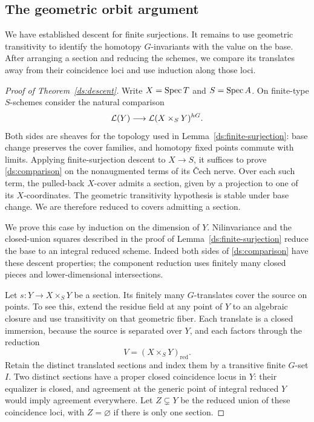 \subsection{The geometric orbit argument}

We have established descent for finite surjections. It remains to use
geometric transitivity to identify the homotopy $G$-invariants with the
value on the base. After arranging a section and reducing the schemes,
we compare its translates away from their coincidence loci and use
induction along those loci.

\begin{proof}[Proof of Theorem~\ref{ds:descent}]
Write $X=\operatorname{Spec} T$ and $S=\operatorname{Spec} A$. On finite-type $S$-schemes
consider the natural comparison
\begin{equation}
 \mathcal{L}(Y)\longrightarrow
 \mathcal{L}(X\times_S Y)^{hG}.
 \label{ds:comparison}
\end{equation}
Both sides are sheaves for the topology used in
Lemma~\ref{ds:finite-surjection}: base change preserves the cover
families, and homotopy fixed points commute with limits. Applying
finite-surjection descent to $X\to S$, it suffices to prove
\eqref{ds:comparison} on the nonaugmented terms of its \v{C}ech
nerve. Over each such term, the pulled-back $X$-cover admits a
section, given by a projection to one of its $X$-coordinates. The
geometric transitivity hypothesis is stable under base change.
We are therefore reduced to covers admitting a section.

We prove this case by induction on the dimension of $Y$.
Nilinvariance and the closed-union squares described in the proof
of Lemma~\ref{ds:finite-surjection} reduce the base to an integral
reduced scheme. Indeed both sides of \eqref{ds:comparison} have
these descent properties; the component reduction uses finitely
many closed pieces and lower-dimensional intersections.

Let $s:Y\to X\times_S Y$ be a section. Its finitely many
$G$-translates cover the source on points. To see this, extend the
residue field at any point of $Y$ to an algebraic closure and use
transitivity on that geometric fiber. Each translate is a closed
immersion, because the source is separated over $Y$, and each
factors through the reduction
\[
 V=(X\times_S Y)_{\mathrm{red}}.
\]
Retain the distinct translated sections and index them by a
transitive finite $G$-set $I$. Two distinct sections have a proper
closed coincidence locus in $Y$: their equalizer is closed, and
agreement at the generic point of integral reduced $Y$ would imply
agreement everywhere. Let $Z\subsetneq Y$ be the reduced union
of these coincidence loci, with $Z=\varnothing$ if there is only
one section.


\end{proof}
